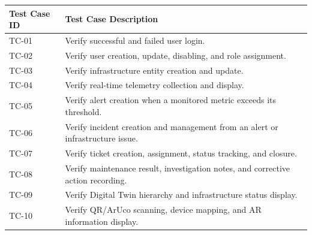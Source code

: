 \begin{xltabular}{\textwidth}{|>{\centering\arraybackslash}p{2.2cm}|>{\raggedright\arraybackslash}X|}
\hline
\textbf{Test Case ID} & \textbf{Test Case Description} \\ \hline
\endfirsthead

\hline
\endhead

\hline
\endfoot

TC-01 & Verify successful and failed user login. \\ \hline
TC-02 & Verify user creation, update, disabling, and role assignment. \\ \hline
TC-03 & Verify infrastructure entity creation and update. \\ \hline
TC-04 & Verify real-time telemetry collection and display. \\ \hline
TC-05 & Verify alert creation when a monitored metric exceeds its threshold. \\ \hline
TC-06 & Verify incident creation and management from an alert or infrastructure issue. \\ \hline
TC-07 & Verify ticket creation, assignment, status tracking, and closure. \\ \hline
TC-08 & Verify maintenance result, investigation notes, and corrective action recording. \\ \hline
TC-09 & Verify Digital Twin hierarchy and infrastructure status display. \\ \hline
TC-10 & Verify QR/ArUco scanning, device mapping, and AR information display. \\ \hline
\end{xltabular}
\endgroup

